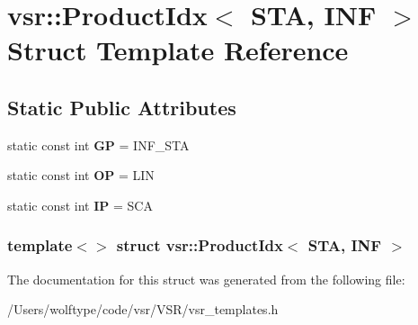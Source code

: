 \hypertarget{structvsr_1_1_product_idx_3_01_s_t_a_00_01_i_n_f_01_4}{\section{vsr\-:\-:Product\-Idx$<$ S\-T\-A, I\-N\-F $>$ Struct Template Reference}
\label{structvsr_1_1_product_idx_3_01_s_t_a_00_01_i_n_f_01_4}
}
\subsection*{Static Public Attributes}
\begin{DoxyCompactItemize}
\item 
\hypertarget{structvsr_1_1_product_idx_3_01_s_t_a_00_01_i_n_f_01_4_ade23d83ebeb34602ba6c41f62f2d5f0f}{static const int {\bfseries G\-P} = I\-N\-F\-\_\-\-S\-T\-A}\label{structvsr_1_1_product_idx_3_01_s_t_a_00_01_i_n_f_01_4_ade23d83ebeb34602ba6c41f62f2d5f0f}

\item 
\hypertarget{structvsr_1_1_product_idx_3_01_s_t_a_00_01_i_n_f_01_4_aa00775a08e4d4e2634ff19eff5cde034}{static const int {\bfseries O\-P} = L\-I\-N}\label{structvsr_1_1_product_idx_3_01_s_t_a_00_01_i_n_f_01_4_aa00775a08e4d4e2634ff19eff5cde034}

\item 
\hypertarget{structvsr_1_1_product_idx_3_01_s_t_a_00_01_i_n_f_01_4_a4ff1471bc3f57e1429a602451a623afe}{static const int {\bfseries I\-P} = S\-C\-A}\label{structvsr_1_1_product_idx_3_01_s_t_a_00_01_i_n_f_01_4_a4ff1471bc3f57e1429a602451a623afe}

\end{DoxyCompactItemize}
\subsubsection*{template$<$$>$ struct vsr\-::\-Product\-Idx$<$ S\-T\-A, I\-N\-F $>$}



The documentation for this struct was generated from the following file\-:\begin{DoxyCompactItemize}
\item 
/\-Users/wolftype/code/vsr/\-V\-S\-R/vsr\-\_\-templates.\-h\end{DoxyCompactItemize}

